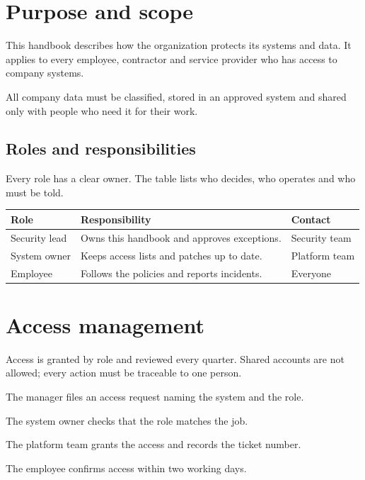 \section{Purpose and scope}
This handbook describes how the organization protects its systems and data.
It applies to every employee, contractor and service provider who has access
to company systems.

\begin{policybox}
  All company data must be classified, stored in an approved system and
  shared only with people who need it for their work.
\end{policybox}

\subsection{Roles and responsibilities}
Every role has a clear owner. The table lists who decides, who operates and
who must be told.

\begin{table}[H]
  \centering
  \begin{tabularx}{\linewidth}{@{}lXl@{}}
    \toprule
    \textbf{Role} & \textbf{Responsibility} & \textbf{Contact} \\
    \midrule
    Security lead & Owns this handbook and approves exceptions. & Security team \\
    System owner & Keeps access lists and patches up to date. & Platform team \\
    Employee & Follows the policies and reports incidents. & Everyone \\
    \bottomrule
  \end{tabularx}
\end{table}

\section{Access management}
Access is granted by role and reviewed every quarter. Shared accounts are not
allowed; every action must be traceable to one person.

\begin{procedurebox}
  \begin{steps}
    \item The manager files an access request naming the system and the role.
    \item The system owner checks that the role matches the job.
    \item The platform team grants the access and records the ticket number.
    \item The employee confirms access within two working days.
  \end{steps}
\end{procedurebox}

